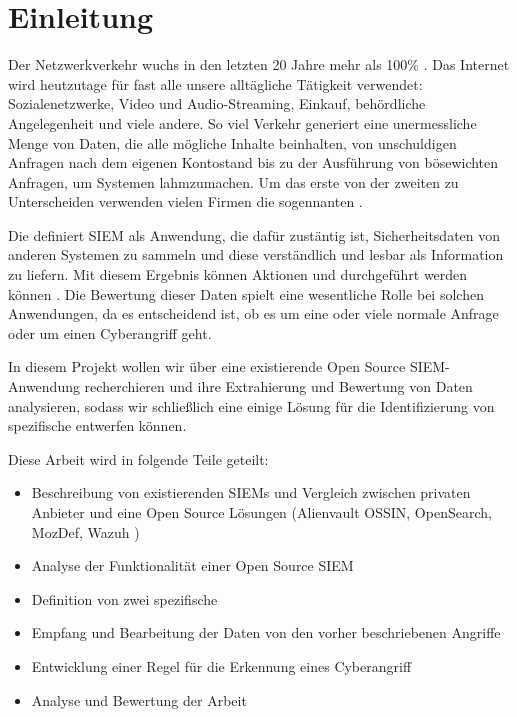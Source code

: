 \section{Einleitung}

Der Netzwerkverkehr wuchs in den letzten 20 Jahre mehr als 100\% \citep{Roser_I}. Das Internet wird heutzutage für fast alle unsere alltägliche Tätigkeit verwendet:  Sozialenetzwerke, Video und Audio-Streaming, Einkauf, behördliche Angelegenheit und viele andere. So viel Verkehr generiert eine unermessliche Menge von Daten, die alle mögliche Inhalte beinhalten, von unschuldigen Anfragen nach dem eigenen Kontostand bis zu der Ausführung von bösewichten Anfragen, um Systemen lahmzumachen. Um das erste von der zweiten zu Unterscheiden verwenden vielen Firmen die sogennanten .

Die  definiert \acrshort{SIEM} als Anwendung, die dafür zustäntig ist, Sicherheitsdaten von anderen Systemen zu sammeln und diese verständlich und lesbar als Information zu liefern. Mit diesem Ergebnis können Aktionen und durchgeführt werden können \citep{NIST_SIEM}. Die Bewertung dieser Daten spielt eine wesentliche Rolle bei solchen Anwendungen, da es entscheidend ist, ob es um eine oder viele normale Anfrage oder um einen \gls{Cyberangriff} geht.

In diesem Projekt wollen wir über eine existierende \gls{Open Source} \gls{SIEM}-Anwendung recherchieren und ihre Extrahierung und Bewertung von Daten analysieren, sodass wir schließlich eine einige Lösung für die Identifizierung von spezifische  entwerfen können.

Diese Arbeit wird in folgende Teile geteilt:

\begin{itemize}[noitemsep]
   \item Beschreibung von existierenden \glspl{SIEM} und Vergleich zwischen privaten Anbieter und eine \gls{Open Source} Lösungen (Alienvault OSSIN, OpenSearch, MozDef, Wazuh )
   \item Analyse der Funktionalität einer \gls{Open Source} \gls{SIEM}
   \item Definition von zwei spezifische 
   \item Empfang und Bearbeitung der Daten von den vorher beschriebenen Angriffe
   \item Entwicklung einer Regel für die Erkennung eines \gls{Cyberangriff}
   \item Analyse und Bewertung der Arbeit
\end{itemize}
